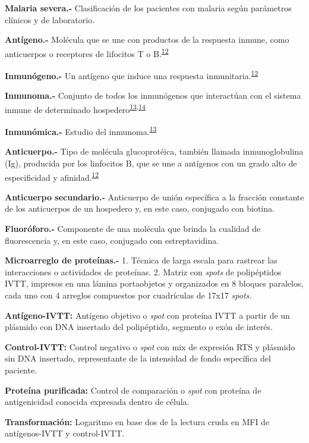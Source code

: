 \documentclass[]{article}
\begin{document}
\textbf{Malaria severa.-} Clasificación de los pacientes con malaria
según parámetros clínicos y de laboratorio.

\textbf{Antígeno.-} Molécula que se une con productos de la respuesta
inmune, como anticuerpos o receptores de lifocitos T o
B.\textsuperscript{\protect\hyperlink{ref-abbas2012}{12}}

\textbf{Inmunógeno.-} Un antígeno que induce una respuesta
inmunitaria.\textsuperscript{\protect\hyperlink{ref-abbas2012}{12}}

\textbf{Inmunoma.-} Conjunto de todos los inmunógenos que interactúan
con el sistema inmune de determinado
hospedero\textsuperscript{\protect\hyperlink{ref-immunomics2016}{13},\protect\hyperlink{ref-sette2005}{14}}

\textbf{Inmunómica.-} Estudio del
inmunoma.\textsuperscript{\protect\hyperlink{ref-immunomics2016}{13}}

\textbf{Anticuerpo.-} Tipo de molécula glucoprotéica, también llamada
inmunoglobulina (Ig), producida por los linfocitos B, que se une a
antígenos con un grado alto de especificidad y
afinidad.\textsuperscript{\protect\hyperlink{ref-abbas2012}{12}}

\textbf{Anticuerpo secundario.-} Anticuerpo de unión específica a la
fracción constante de los anticuerpos de un hospedero y, en este caso,
conjugado con biotina.

\textbf{Fluoróforo.-} Componente de una molécula que brinda la cualidad
de fluorescencia y, en este caso, conjugado con estreptavidina.

\textbf{Microarreglo de proteínas.-} 1. Técnica de larga escala para
rastrear las interacciones o actividades de proteínas. 2. Matriz con
\emph{spots} de polipéptidos IVTT, impresos en una lámina portaobjetos y
organizados en 8 bloques paralelos, cada uno con 4 arreglos compuestos
por cuadrículas de 17x17 \emph{spots}.

\textbf{Antígeno-IVTT:} Antígeno objetivo o \emph{spot} con proteína
IVTT a partir de un plásmido con DNA insertado del polipéptido, segmento
o exón de interés.

\textbf{Control-IVTT:} Control negativo o \emph{spot} con mix de
expresión RTS y plásmido sin DNA insertado, representante de la
intensidad de fondo específica del paciente.

\textbf{Proteína purificada:} Control de comparación o \emph{spot} con
proteína de antigenicidad conocida expresada dentro de célula.

\textbf{Transformación:} Logaritmo en base dos de la lectura cruda en
MFI de antígenos-IVTT y control-IVTT.
\end{document}
